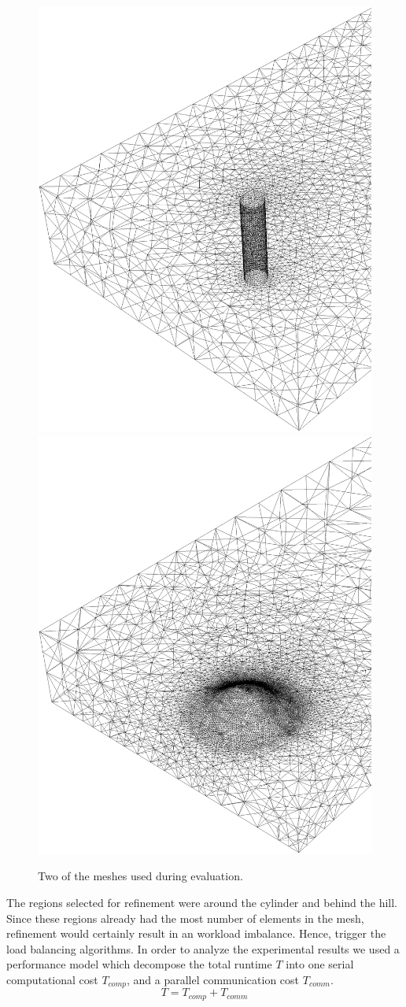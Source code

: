 \begin{figure}[bt]
  \begin{center}
    \includegraphics[width=0.45\columnwidth]{chapters/hoffman-4/eps/cylmesh.eps}
    \includegraphics[width=0.45\columnwidth]{chapters/hoffman-4/eps/hillmesh2.eps}
  \end{center}
  \caption{Two of the meshes used during evaluation.}
\end{figure}

The regions selected for refinement were around the cylinder and
behind the hill. Since these regions already had the most number of
elements in the mesh, refinement would certainly result in an workload
imbalance. Hence, trigger the load balancing algorithms. In order to
analyze the experimental results we used a performance model which
decompose the total runtime $T$ into one serial computational cost
$T_{comp}$, and a parallel communication cost $T_{comm}$.
\begin{equation}
  T = T_{comp} + T_{comm}
\end{equation}


